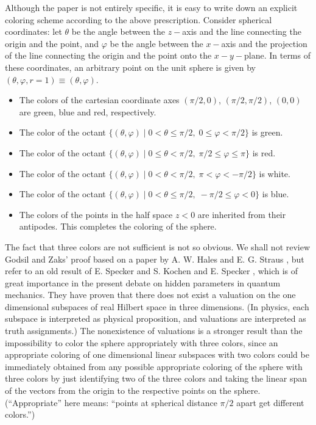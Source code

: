 Although the paper is not entirely specific,
it is easy to write down an explicit coloring scheme according
to the above prescription.
Consider spherical coordinates: let
$\theta$ be the angle between the $z-$axis and the line connecting the origin and the point, and
$\varphi$ be the angle between the $x-$axis and the projection  of the line connecting the origin and the point
onto the $x-y-$plane.
In terms of these coordinates, an arbitrary point on the unit sphere is given by
$(\theta, \varphi, r=1) \equiv (\theta,\varphi)$.
\begin{itemize}
\item
The colors of the cartesian coordinate axes $(\pi/2,0)$, $(\pi/2,\pi/2)$, $(0,0)$
are
green,
blue and  red, respectively.
\item
The color of the octant
$\{(\theta, \varphi ) \mid 0 < \theta \le \pi /2,\; 0\le \varphi < \pi/2\}$ is green.
\item
The color of the  octant
$\{(\theta, \varphi ) \mid 0 \le \theta < \pi /2,\; \pi /2 \le \varphi \le \pi\}$ is red.
\item
The color of the octant
$\{(\theta, \varphi ) \mid 0 < \theta < \pi /2,\; \pi  < \varphi < -\pi /2\}$ is white.
\item
The color of the octant
$\{(\theta, \varphi ) \mid 0 < \theta \le \pi /2,\; -\pi /2  \le \varphi < 0\}$ is blue.
\item
The colors of the points in the half space $z<0$ are inherited from their antipodes.
This completes the coloring of the sphere.
\end{itemize}


The fact that three colors are not sufficient is not so obvious.
We shall not review Godsil and Zaks' proof based on a paper by
A. W. Hales and E. G. Straus \cite{hales}, but refer to an old result of
E. Specker \cite{specker-60} and S. Kochen and E. Specker \cite{kochen1},
which is of great importance in the
present debate on hidden parameters in quantum mechanics.
They have proven that there does not exist a valuation
on the one dimensional subspaces of real Hilbert space in three dimensions.
(In physics, each subspace is interpreted as physical proposition, and valuations are
interpreted as truth assignments.)
The nonexistence of valuations is a stronger result than the impossibility to
color the sphere appropriately with three colors, since
an appropriate coloring of one dimensional linear subspaces
with two colors could be immediately  obtained
from any possible appropriate coloring of  the sphere with three colors
by just identifying two of the
three colors and taking the linear span of the
vectors from the origin to the respective points on the sphere.
(``Appropriate'' here means: ``points at spherical distance $\pi /2$ apart get different colors.'')

